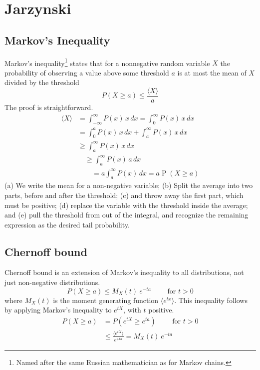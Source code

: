 \documentclass[Lectures.tex]{subfiles}
\begin{document}
\clearpage
\section{Jarzynski}


\subsection{Markov's Inequality}

Markov's inequality\footnote{Named after the same Russian mathematician as for Markov chains.} states that for a nonnegative random variable $X$ the probability of observing a value above some threshold $a$ is at most the mean of $X$ divided by the threshold
\[
P(X\geq a) \leq \frac{\langle X \rangle}{a} 
\]
The proof is straightforward.
\begin{subequations}
\begin{align}
\langle X \rangle & =\int_{-\infty}^\infty P(x)\, x \, dx  = \int_0^\infty P(x)\, x \, dx \\
& = \int_0^a P(x)\, x \, dx + \int_a^\infty P(x)\, x \, dx \\
& \ge  \int_a^\infty P(x)\, x \, dx \\
& \quad \ge\int_a^\infty P(x)\, a \, dx 
\\
& \qquad = a\int_a^\infty P(x) \, dx= a \operatorname{P}(X \ge a)
\end{align}
\end{subequations}
(a) We write the mean for a non-negative variable; (b) Split the average into two parts, before and after the threshold; (c) and throw away the first part, which must be positive; (d) replace the variable with the threshold inside the average; and (e) pull the threshold from out of the integral, and recognize the remaining expression as the desired tail probability.

\subsection{Chernoff bound}
Chernoff bound is an extension of Markov's inequality to all distributions, not just non-negative distributions.
\[
 P\left(X \geq a \right) \leq M_X(t)\ e^{-t a} \qquad \text{ for } t > 0
\]
where $M_X(t)$ is the moment generating function $\langle e^{t x}\rangle$. This inequality follows by applying Markov's inequality to $e^{tX}$, with $t$ positive.
\begin{align*}
 P\left(X \geq a \right) & =  P \left(e^{t X} \geq e^{t a}\right) \qquad \text{ for } t > 0 \\
 & \leq \frac{\langle e^{t X}\rangle}{e^{+t a}} = M_X(t)\ e^{-t a} 
\end{align*} 
\end{document}
